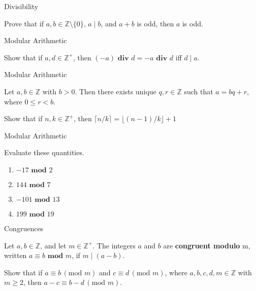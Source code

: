 \documentclass{beamer}
\renewcommand{\mod}{\textbf{ mod }}
\begin{document}
\begin{frame}[t]{Divisibility}
    \begin{example}
        Prove that if $a,b \in \mathbb{Z} \setminus \{0\}$, $a \mid b$, and $a + b$ is odd, then $a$ is odd. 
    \end{example}
\end{frame}

\begin{frame}[t]{Modular Arithmetic}
    \begin{example}
        Show that if $a,d \in \mathbb{Z^+}$, then $(-a) \textbf{ div } d = -a \textbf{ div } d$ iff $d \mid a$.
    \end{example}
\end{frame}

\begin{frame}[t]{Modular Arithmetic}
    \begin{theorem}
        Let $a,b \in \mathbb{Z}$ with $b > 0$. Then there exists unique $q,r \in \mathbb{Z}$ such that $a = bq+r$, where $0 \leq r < b$. 
    \end{theorem}
    \begin{example}
        Show that if $n,k \in \mathbb{Z^+}$, then $\lceil n/k \rceil = \lfloor (n-1)/k \rfloor + 1$
    \end{example}
\end{frame}

\begin{frame}{Modular Arithmetic}
    \begin{example}
        Evaluate these quantities. \begin{enumerate}
            \item $-17 \textbf{ mod } 2$ \vspace{8mm}
            \item $144 \mod 7$ \vspace{8mm}
            \item $-101 \mod 13$ \vspace{8mm}
            \item $199 \mod 19$ \vspace{10mm}
        \end{enumerate}
    \end{example}
\end{frame}

\begin{frame}[t]{Congruences}
    \begin{definition}
        Let $a,b \in \mathbb{Z}$, and let $m \in \mathbb{Z^+}$. The integers $a$ and $b$ are \textbf{congruent modulo} m, written $a \equiv b \mod m$, if $m \mid (a - b)$. 
    \end{definition}
    \begin{example}
        Show that if $a \equiv b \, (\text{mod } m)$ and $c \equiv d \, (\text{mod } m)$, where $a,b,c,d,m \in \mathbb{Z}$ with $m \geq 2$, then $a - c \equiv b - d \, (\text{mod } m)$.
    \end{example}
\end{frame}
\end{document}
